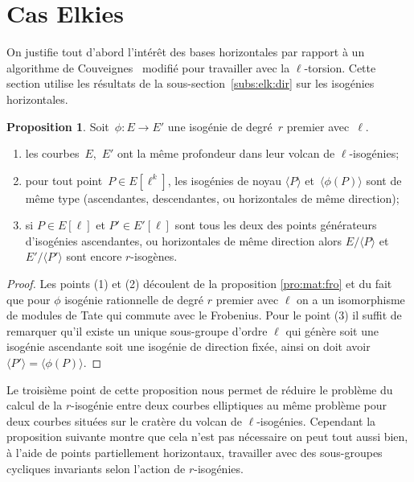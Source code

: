 \documentclass[10pt,a4paper]{book}
\theoremstyle{plain}
\theoremstyle{definition}
\theoremstyle{definition}
\theoremstyle{definition}
\newtheorem{prop}[thm]{Proposition}
\theoremstyle{definition}
\theoremstyle{remark}
\theoremstyle{remark}
\theoremstyle{definition}
\begin{document}
\section{Cas Elkies}
 
On justifie tout d'abord l'intérêt des bases horizontales par rapport à un 
algorithme de Couveignes~\cite{Couveignes96} modifié pour travailler avec la
$\ell$-torsion. Cette section utilise les résultats de la 
sous-section~\ref{subs:elk:dir} sur les isogénies horizontales.

\begin{prop}\label{pro:par:iso}
Soit~$\phi: E \rightarrow E'$ une isogénie de degré~$r$ premier avec~$\ell$.
\begin{enumerate}
\item les courbes~$E$,~$E'$ ont la même profondeur dans leur volcan de
 $\ell$-isogénies;
\item\label{pro:par:fun} pour tout point~$P \in E[\ell^k]$,
les isogénies de noyau $\langle P \rangle$ et~$\langle \phi(P) \rangle$ sont de même type
(ascendantes, descendantes, ou horizontales de même direction);
\item\label{pro:par:asc} si $P \in E[\ell]$ et $P' \in E'[\ell]$ sont tous les 
deux des points générateurs d'isogénies ascendantes, ou horizontales de même 
direction alors $E/\langle P \rangle$ et~$E'/\langle P' \rangle$ sont encore $r$-isogènes.
\end{enumerate}
\end{prop}

\begin{proof}
Les points (1) et (2) découlent de la proposition \ref{pro:mat:fro} et du fait que pour $\phi$ isogénie rationnelle de degré $r$ premier avec $\ell$ on a un isomorphisme de modules de Tate qui commute avec le Frobenius. Pour le point (3) il suffit de remarquer qu'il existe un unique sous-groupe d'ordre $\ell$ qui génère soit une isogénie ascendante soit une isogénie de direction fixée, ainsi on doit avoir $\langle P' \rangle=\langle \phi(P) \rangle$.

\end{proof}
Le troisième point de cette proposition nous permet de réduire le problème du 
calcul de la $r$-isogénie entre deux courbes elliptiques au même problème pour 
deux courbes situées sur le cratère du volcan de $\ell$-isogénies. Cependant la
proposition suivante montre que cela n'est pas nécessaire on peut tout aussi 
bien, à l'aide de points partiellement horizontaux, travailler avec des 
sous-groupes cycliques invariants selon l'action de $r$-isogénies. 
\end{document}
